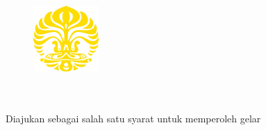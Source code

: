 %
%
%

\begin{titlepage}
	\begin{singlespace*}
	    \begin{center}
	    	\begin{figure}
	            \begin{center}
	                \includegraphics[width=2.5cm]{assets/pics/makara_kuning.png}
	            \end{center}
	        \end{figure}
	        \vspace*{-0.25cm}
	        \large
	
	        \vspace*{1.0cm}
	        \large
	        \bo{\Judul} \\[1.0cm]
	
	        \vspace*{2.5 cm}
	        \large
	        \bo{\Type} \\[0.5cm]
	        \normalsize
	        Diajukan sebagai salah satu syarat untuk memperoleh gelar \\
	        \gelar\\
	
	        \vspace*{4 cm}
	        
	        \large
	        \ifx\blank\npmDua
		        \bo{\PenulisSatu} \\
		        \bo{\npmSatu} \\
		    \else
		    	\bo{\PenulisSatu~/ \npmSatu~/ \ProgramSatu}\\
		    	\bo{\PenulisDua~/ \npmDua~/ \ProgramDua}\\
		    \fi
		    \ifx\blank\npmTiga\else
			    \bo{\PenulisTiga~/ \npmTiga~/ \ProgramTiga}\\
		    \fi
		    
	        \vspace*{4.25 cm}
	
	        \large
	        \normalsize
	    \end{center}
	\end{singlespace*}
\end{titlepage}

